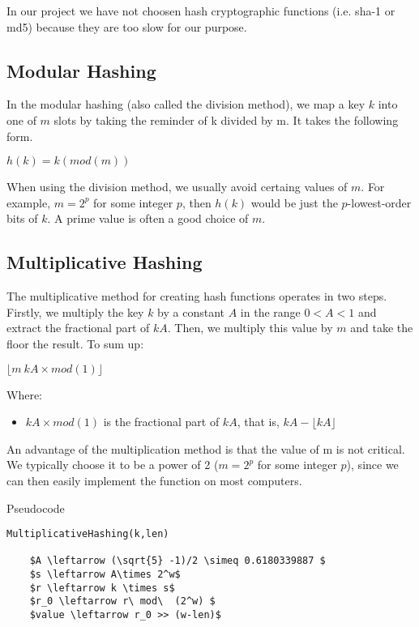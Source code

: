 \documentclass[12pt]{article}
\begin{document}
In our project we have not choosen hash cryptographic functions (i.e. sha-1 or md5) because they are too slow for our purpose.

\subsection{Modular Hashing}

In the modular hashing (also called the division method), we map a key $k$ into one of $m$ slots by taking the reminder of k divided by m. It takes the following form. 

\begin{center} $h(k) = k (mod (m))$ \end{center}

When using the division method, we usually avoid certaing values of $m$. For example, $m = 2^p$ for some integer $p$, then $h(k)$ would be just the $p$-lowest-order bits of $k$. A prime value is often a good choice of $m$.



\subsection{Multiplicative Hashing}
The multiplicative method for creating hash functions operates in two steps.
Firstly, we multiply the key $k$ by a constant $A$ in the range $0<A<1$ and extract the fractional part of $kA$. Then, we multiply this value by $m$ and take the floor the result. To sum up:  

\begin{center}
 $ \lfloor m\ kA \times mod(1)  \rfloor$
\end{center}
Where:
\begin{itemize}
\item $kA  \times mod(1)$  is the fractional part of $kA$, that is, $kA- \lfloor kA \rfloor$
\end{itemize}
An advantage of the multiplication method is that the value of m is not critical. We typically choose it to be a power of 2 ($m = 2^p$ for some integer $p$), since we can then easily implement the function on most computers.
\\

\begin{center}
\begin{large}
Pseudocode 
\end{large}
\end{center}

\begin{lstlisting}[mathescape=true]
MultiplicativeHashing(k,len)

	$A \leftarrow (\sqrt{5} -1)/2 \simeq 0.6180339887 $
	$s \leftarrow A\times 2^w$
	$r \leftarrow k \times s$ 
	$r_0 \leftarrow r\ mod\  (2^w) $ 
	$value \leftarrow r_0 >> (w-len)$

\end{lstlisting}
\end{document}
